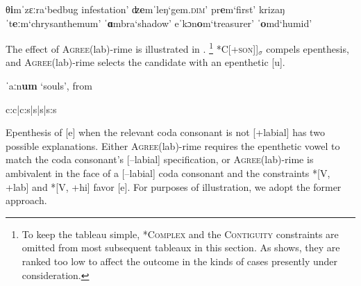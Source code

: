 \documentclass[output=paper,colorlinks,citecolor=brown]{langscibook}
\begin{document}
\begin{exe}
    \ex \label{Vm}
        \begin{xlist}
            \ex θ\textbf{i}mˈzɛːra\tab `bedbug infestation'
            \ex ʣ\textbf{e}mˈleŋ\tab `gem.\textsc{dim}'
            \ex pr\textbf{e}m\tab `first'
            \ex krizaŋˈt\textbf{eː}m\tab `chrysanthemum'
            \ex ˈ\textbf{ɑ}mbra\tab `shadow'
            \ex eˈkɔn\textbf{o}m\tab `treasurer'
            \ex ˈ\textbf{o}md\tab `humid'
        \end{xlist}
\end{exe}

The effect of \textsc{Agree}(lab)-rime is illustrated in . \footnote{To keep the tableau simple, \textsc{*Complex} and the \textsc{Contiguity} constraints are omitted from most subsequent tableaux in this section.  As  shows, they are ranked too low to affect the outcome in the kinds of cases presently under consideration.} \textsc{*C[+son]]$_\sigma$} compels epenthesis, and \textsc{Agree}(lab)-rime selects the candidate with an epenthetic [u].


\begin{table}
\caption{ˈaːn\textbf{um} `souls', from }
\label{soulsprelim}
\begin{center}
\ShadingOn
\begin{tableau}{c:c|c:s|s|s|s:s} 
      \const*{\rotatebox{90}{\textsc{*C[+son]]$_\sigma$}}}        
               \vio{*!}     \vio{}  \vio{}    \vio{}                                    \vio{*}     \vio{}  \vio{}    \vio{}
              \vio{}     \vio{}  \vio{*!}    \vio{*}                                      \vio{}     \vio{*}  \vio{}    \vio{}
    \vio{}      \vio{}  \vio{}     \vio{*}
                             \vio{}     \vio{*}  \vio{*}    \vio{*} 
\end{tableau}
\end{center}
\end{table}



Epenthesis of [e] when the relevant coda consonant is not [+labial] has two possible explanations.  Either \textsc{Agree}(lab)-rime requires the epenthetic vowel to match the coda consonant's [--labial] specification, or \textsc{Agree}(lab)-rime is ambivalent in the face of a [--labial] coda consonant and the constraints *[V, +lab] and *[V, +hi] favor [e].  For purposes of illustration, we adopt the former approach.
\end{document}
